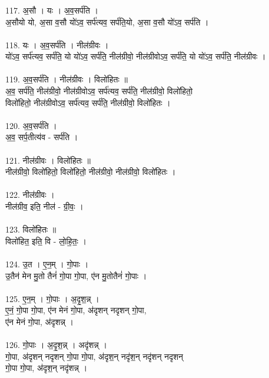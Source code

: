 \subsubsection{}
117. अ॒सौ । यः । अ॒व॒सर्प॑ति ।\\
अ॒सौयो यो, अ॒सा व॒सौ यो॑ऽव॒ सर्प॑त्यव॒ सर्प॑ति॒यो, अ॒सा व॒सौ यो॑ऽव॒ सर्प॑ति ।\\
\\
118. यः । अ॒व॒सर्प॑ति । नील॑ग्रीवः ।\\
यो॑ऽव॒ सर्प॑त्यव॒ सर्प॑ति॒ यो यो॑ऽव॒ सर्प॑ति॒ नील॑ग्रीवो॒ नील॑ग्रीवोऽव॒ सर्प॑ति॒ यो यो॑ऽव॒ सर्प॑ति॒ नील॑ग्रीवः ।\\
\\
119. अ॒व॒सर्प॑ति । नील॑ग्रीवः । विलो॑हितः ॥\\
अ॒व॒ सर्प॑ति॒ नील॑ग्रीवो॒ नील॑ग्रीवोऽव॒ सर्प॑त्यव॒ सर्प॑ति॒ नील॑ग्रीवो॒ विलो॑हितो॒\\
विलो॑हितो॒ नील॑ग्रीवोऽव॒ सर्प॑त्यव॒ सर्प॑ति॒ नील॑ग्रीवो॒ विलो॑हितः ।\\
\\
120. अ॒व॒सर्प॑ति ।\\
अ॒व॒ सर्प॒तीत्य॑व - सर्प॑ति ।\\
\\
121. नील॑ग्रीवः । विलो॑हितः ॥\\
नील॑ग्रीवो॒ विलो॑हितो॒ विलो॑हितो॒ नील॑ग्रीवो॒ नील॑ग्रीवो॒ विलो॑हितः ।\\
\\
122. नील॑ग्रीवः ।\\
नील॑ग्रीव॒ इति॒ नील॑ - ग्री॒वः॒ ।\\
\\
123. विलो॑हितः ॥\\
विलो॑हित॒ इति॒ वि - लो॒हि॒तः॒ ।\\
\\
124. उ॒त । ए॒न॒म् । गो॒पाः ।\\
उ॒तैन॑ मेन मु॒तो तैनं॑ गो॒पा गो॒पा, ए॑न मु॒तोतैनं॑ गो॒पाः ।\\
\\
125. ए॒न॒म् । गो॒पाः । अ॒दृ॒श॒न्न् ।\\
ए॒नं॒ गो॒पा गो॒पा, ए॑न मेनं गो॒पा, अ॑दृशन् नदृशन् गो॒पा,\\
ए॑न मेनं गो॒पा, अ॑दृशन्न् ।\\
\\
126. गो॒पाः । अ॒दृ॒श॒न्न् । अदृ॑शन्न् ।\\
गो॒पा, अ॑दृशन् नदृशन् गो॒पा गो॒पा, अ॑दृश॒न् नदृ॑श॒न् नदृ॑शन् नदृशन्\\
गो॒पा गो॒पा, अ॑दृश॒न् नदृ॑शन्न् ।\\
